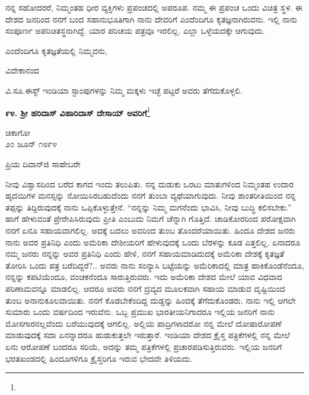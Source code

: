 ನನ್ನ ಸಹೋದರರೆ, ನಿಮ್ಮಂತಹ ಧೀರ ವ್ಯಕ್ತಿಗಳು ಪ್ರಪಂಚದಲ್ಲಿ ಅಪರೂಪ. ನಮ್ಮ ಈ ಪ್ರಪಂಚ ಒಂದು ವಿಚಿತ್ರ ಸ್ಥಳ. ಈ ದೇಶದ ಜನರಿಂದ ನನಗೆ ಬಂದ ಸಹಾನುಭೂತಿಗಾಗಿ ನಾನು ದೇವರಿಗೆ ಎಂದೆಂದಿಗೂ ಕೃತಜ್ಞನಾಗಿರುವನು. ಇಲ್ಲಿ ನಾನು ಸಂಪೂರ್ಣ ಅಪರಿಚಿತಸ್ಥನಾಗಿದ್ದೆ. ಯಾರ ಪರಿಚಯ ಪತ್ರವೂ ಇರಲಿಲ್ಲ. ಎಲ್ಲಾ ಒಳ್ಳೆಯದಕ್ಕೇ ಆಗುವುದು.

ಎಂದೆಂದಿಗೂ ಕೃತಜ್ಞತೆಯಲ್ಲಿ ನಿಮ್ಮವನು,
\vspace{-0.4cm}

\begin{flushright}
ವಿವೇಕಾನಂದ
\end{flushright}

ವಿ.ಸೂ.\enginline{-}ಈಸ್ಟ್ ಇಂಡಿಯಾ ಸ್ಟಾಂಪುಗಳನ್ನು ನಿಮ್ಮ ಮಕ್ಕಳು ಇಚ್ಛೆ ಪಟ್ಟರೆ ಅವರು ತೆಗೆದುಕೊಳ್ಳಲಿ.

\begin{center}
\textbf{೯೪. ಶ‍್ರೀ ಹರಿದಾಸ್ ವಿಹಾರಿದಾಸ್ ದೇಸಾಯ್ ಅವರಿಗೆ}\footnote{}
\end{center}
\vspace{-0.5cm}

\begin{flushright}
ಚಿಕಾಗೋ\\೨೦ ಜೂನ್ ೧೮೯೪
\end{flushright}

\noindent
ಪ್ರಿಯ ದಿವಾನ್‌ಜಿ ಸಾಹೇಬರೇ

ನೀವು ವಿಶ್ವಾಸದಿಂದ ಬರೆದ ಕಾಗದ ಇಂದು ತಲುಪಿತು. ನನ್ನ ದುಡುಕು ಒರಟು ಮಾತುಗಳಿಂದ ನಿಮ್ಮಂತಹ ಉದಾರ ಹೃದಯಿಗಳ ಮನಸ್ಸನ್ನು ನೋಯಿಸಿರಬಹುದೆಂದು ನನಗೆ ತುಂಬಾ ವ್ಯಥೆಯಾಗುವುದು. ನೀವು ಶಾಂತರೀತಿಯಿಂದ ನನ್ನ ತಪ್ಪನ್ನು ತಿದ್ದಿರುವುದಕ್ಕೆ ನಾನು ಒಪ್ಪಿಕೊಳ್ಳುತ್ತೇನೆ. “ನನ್ನನ್ನು ನಿಮ್ಮ ಮಗನೆಂದು ಭಾವಿಸಿ, ನೀವು ಬುದ್ಧಿ ಕಲಿಸಬೇಕು.” ಹಾಗೆ ಹೇಳುವಂತೆ ಪ್ರೇರೇಪಿಸಿರುವುದು ಪ್ರೀತಿ ಎಂಬುದು ನಿಮಗೆ ಚೆನ್ನಾಗಿ ಗೊತ್ತಿದೆ. ಚಾಡಿಕೋರರಿಂದ ಪರೋಕ್ಷವಾಗಿ ನನಗೆ ಏನೂ ಸಹಾಯವಾಗಲಿಲ್ಲ. ಅದಕ್ಕೆ ಬದಲು ಅವರಿಂದ ತುಂಬ ತೊಂದರೆಯಾಯಿತು. ಹಿಂದೂ ದೇಶದ ಜನರು ನಾನು ಅವರ ಪ್ರತಿನಿಧಿ ಎಂದು ಅಮೆರಿಕಾ ದೇಶೀಯರಿಗೆ ಹೇಳುವುದಕ್ಕೆ ಒಂದು ಬೆರಳನ್ನು ಕೂಡ ಎತ್ತಲಿಲ್ಲ. ಏನಾದರೂ ನಮ್ಮ ಜನರು ನನ್ನನ್ನು ಅವರ ಪ್ರತಿನಿಧಿ ಎಂದು ಹೇಳಿ, ನನಗೆ ಸಹಾಯಮಾಡಿದುದಕ್ಕೆ ಅಮೆರಿಕಾ ದೇಶಕ್ಕೆ ಕೃತಜ್ಞತೆ ತೋರಿಸಿ ಒಂದು ಪತ್ರ ಬರೆದಿದ್ದರೆ?.. ಅವರು ನಾನು ಸಂನ್ಯಾಸಿ ಬಟ್ಟೆಯನ್ನು ಅಮೆರಿಕಾದಲ್ಲಿ ಮಾತ್ರ ಹಾಕಿಕೊಂಡೆನೆಂದೂ, ನನ್ನನ್ನು ಕಪಟಿಯೆಂದೂ, ವಂಚಕನೆಂದೂ ಸಾರುತ್ತಿರುವರು. ಇದು ಅಮೆರಿಕಾ ದೇಶದ ಮೇಲೆ ಯಾವ ವಿಧವಾದ ಪರಿಣಾಮವನ್ನೂ ಮಾಡಲಿಲ್ಲ. ಆದರೂ ಅವರು ನನಗೆ ದ್ರವ್ಯದ ಮೂಲಕವಾಗಿ ಸಹಾಯ ಮಾಡುವ ದೃಷ್ಟಿಯಿಂದ ತುಂಬ ಅನಾನುಕೂಲವಾಯಿತು. ನನಗೆ ಕೊಡಬೇಕೆಂದಿದ್ದ ದುಡ್ಡನ್ನು ಹಿಂದಕ್ಕೆ ತೆಗೆದುಕೊಂಡರು. ನಾನು ಇಲ್ಲಿ ಆಗಲೇ ಸುಮಾರು ಒಂದು ವರ್ಷದಿಂದ ಇರುವೆನು. ಒಬ್ಬ ಪ್ರಮುಖ ಭಾರತೀಯನಿಗಾದರೂ ಇಲ್ಲಿಯ ಜನರಿಗೆ ನಾನು ಮೋಸಗಾರನಲ್ಲವೆಂದು ಬರೆಯುವುದಕ್ಕೆ ಆಗಲಿಲ್ಲ. ಅಲ್ಲಿಯ ಪಾದ್ರಿಗಳಾದರೋ ನನ್ನ ಮೇಲೆ ದೋಷಾರೋಪಣೆ ಮಾಡುವುದಕ್ಕೆ ಸದಾ ಏನನ್ನಾದರೂ ಹುಡುಕುತ್ತಲೇ ಇರುತ್ತಾರೆ. ಇಂಡಿಯಾ ದೇಶದ ಕ್ರೈಸ್ತ ಪತ್ರಿಕೆಗಳಲ್ಲಿ ನನ್ನ ಮೇಲೆ ಏನು ಆರೋಪಣೆ ಬಂದರೂ ಸರಿಯೆ, ಅದನ್ನು ತಮ್ಮ ಪತ್ರಿಕೆಗಳಲ್ಲಿ ಪ್ರಚಾರಪಡಿಸುತ್ತಿರುವರು. ಇಲ್ಲಿಯ ಜನರಿಗೆ ಭರತಖಂಡದಲ್ಲಿ ಹಿಂದೂಗಳಿಗೂ ಕ್ರೈಸ್ತರಿಗೂ ಇರುವ ಭೇದವೇ ತಿಳಿಯದು.

